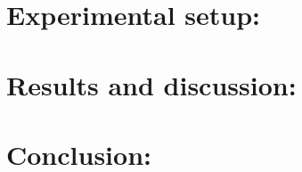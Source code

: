 \documentclass[12pt,a4paper] {article}
\begin{document}
	\section{Experimental setup:}




	\section{Results and discussion:}


	\section{Conclusion:}
\end{document}
